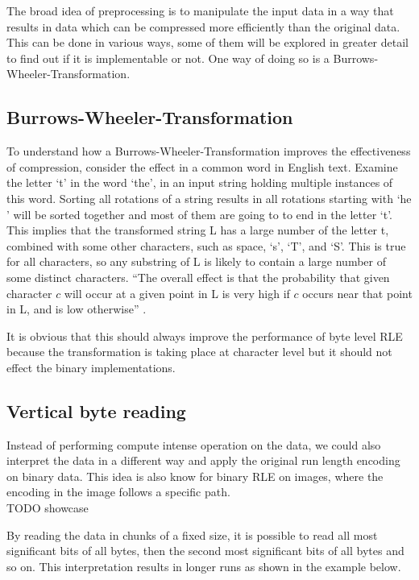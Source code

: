The broad idea of preprocessing is to manipulate the input data in a way that results in data which can be compressed more efficiently than the original data. This can be done in various ways, some of them will be explored in greater detail to find out if it is implementable or not. One way of doing so is a Burrows-Wheeler-Transformation.

\subsection{Burrows-Wheeler-Transformation}
\label{ch:Analysis:sec:Improvements by Preprocessing:subSec:bwt}
\par{
To understand how a Burrows-Wheeler-Transformation improves the effectiveness of compression, consider the effect in a common word in English text. Examine the letter ‘t’ in the word ‘the’, in an input string holding multiple instances of this word.
Sorting all rotations of a string results in all rotations starting with ‘he ’ will be sorted together and most of them are going to to end in the letter ‘t’. This implies that the transformed string L has a large number of the letter t, combined with some other characters, such as space, ‘s’, ‘T’, and ‘S’. This is true for all characters, so any substring of L is likely to contain a large number of some distinct characters. \enquote{The overall effect is that the probability that given character $c$ will occur at a given
point in L is very high if $c$ occurs near that point in L, and is low otherwise} \cite{Burrows94}.
}

\par{
It is obvious that this should always improve the performance of byte level RLE because the transformation is taking place at character level but it should not effect the binary implementations. 
}

\subsection{Vertical byte reading}
\label{ch:Analysis:sec:Improvements by Preprocessing:subSec:vertReading}
\par{
Instead of performing compute intense operation on the data, we could also interpret the data in a different way and apply the original run length encoding on binary data. This idea is also know for binary RLE on images, where the encoding in the image follows a specific path.\\
 TODO showcase}

\par{ By reading the data in chunks of a fixed size, it is possible to read all most significant bits of all bytes, then the second most significant bits of all bytes and so on. This interpretation results in longer runs as shown in the example below.
}

